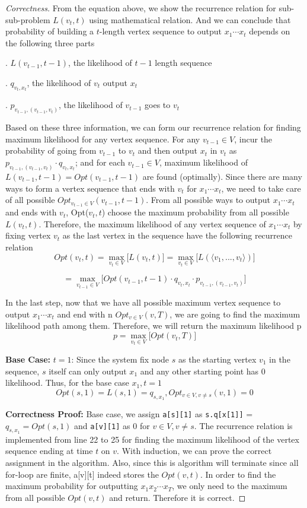 \documentclass[openany]{article}
\begin{document}
\begin{proof}[Correctness]{}
From the equation above, we show the recurrence relation for sub-sub-problem $L(v_t,t)$ using mathematical relation. And we can conclude that probability of building a $t$-length vertex sequence to output $x_1\cdots x_t$ depends on the following three parts

. $L(v_{t-1},t-1)$, the likelihood of $t-1$ length sequence

. $q_{v_t, x_t}$, the likelihood of $v_t$ output $x_t$

. $p_{v_{t-1}, (v_{t-1}, v_t)}$, the likelihood of $v_{t-1}$ goes to $v_t$

Based on these three information, we can form our recurrence relation for finding maximum likelihood for any vertex sequence. For any $v_{t-1} \in V$, incur the probability of going from $v_{t-1}$ to $v_t$ and then output $x_t$ in $v_t$ as $p_{v_{t-1}, (v_{t-1},v_t)} \cdot q_{v_t,x_t}$; and for each $v_{t-1}\in V$, maximum likelihood of $L(v_{t-1},t-1) = Opt(v_{t-1},t-1)$ are found (optimally). Since there are many ways to form a vertex sequence that ends with $v_t$ for $x_1\cdots x_t$, we need to take care of all possible $Opt_{v_{t-1}\in V}(v_{t-1},t-1)$. From all possible ways to output $x_1\cdots x_t$ and ends with $v_t$, Opt($v_t,t$) choose the maximum probability from all possible $L(v_t, t)$. Therefore, the maximum likelihood of any vertex sequence of $x_1\cdots x_t$ by fixing vertex $v_t$ as the last vertex in the sequence have the following recurrence relation
\[Opt(v_t,t) = \mathop{\max}_{v_t\in V} \Bigg[ L(v_t,t) \Bigg]
= \mathop{\max}_{v_t\in V} \Bigg[ L(\langle v_1,...,v_{t} \rangle) \Bigg]  \]

\[= \mathop{\max}_{v_{t-1}\in V} \Bigg[ Opt(v_{t-1},t-1) \cdot q_{v_t,x_t} \cdot p_{v_{t-1},(v_{t-1},v_t)} \Bigg]\]

In the last step, now that we have all possible maximum vertex sequence to output $x_1\cdots x_t$ and end with n $Opt_{v\in V}(v,T)$, we are going to find the maximum likelihood path among them. Therefore, we will return the maximum likelihood p
\[p = \mathop{\max}_{v_{t}\in V} \Bigg[ Opt(v_{t},T)\Bigg]\]


\textbf{Base Case:}
$t = 1$: Since the system fix node $s$ as the starting vertex $v_1$ in the sequence, $s$ itself can only output $x_1$ and any other starting point has 0 likelihood. Thus, for the base case $x_1, t=1$
\[Opt(s,1) = L(s,1) = q_{s,x_1} , Opt_{v\in V, v\neq s}(v,1) = 0\]
    

\textbf{Correctness Proof:}
Base case, we assign \texttt{a[s][1]} as \texttt{s.q[x[1]]} = $q_{s,x_1} = Opt(s,1)$ and \texttt{a[v][1]} as 0 for $v\in V, v\neq s$. The recurrence relation is implemented from line 22 to 25 for finding the maximum likelihood of the vertex sequence ending at time $t$ on $v$. With induction, we can prove the correct assignment in the algorithm. Also, since this is algorithm will terminate since all for-loop are finite, a[v][t] indeed stores the $Opt(v,t)$. In order to find the maximum probability for outputting $x_1x_2\cdots x_T$, we only need to the maximum from all possible $Opt(v,t)$ and return. Therefore it is correct.
\end{proof}
\end{document}
